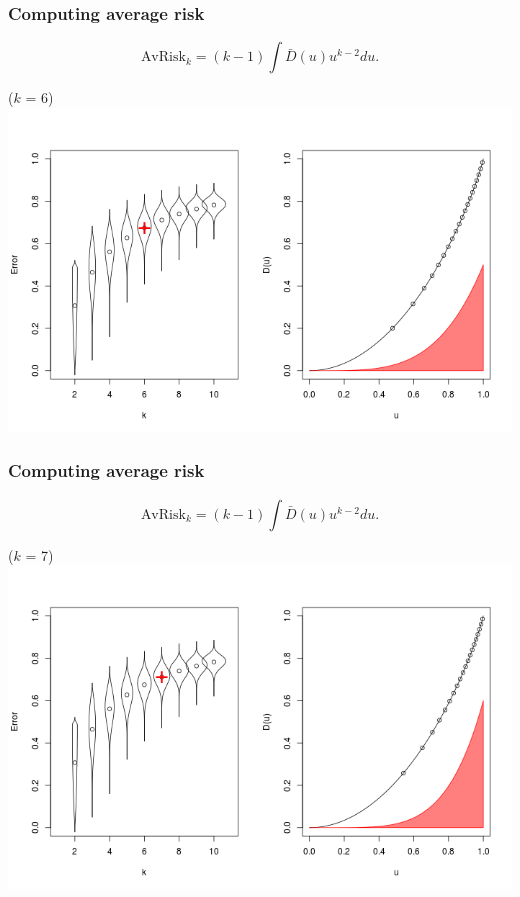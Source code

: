 \documentclass{beamer}
\begin{document}
\begin{frame}
\frametitle{Computing average risk}
\[
\text{AvRisk}_k = (k-1) \int \bar{D}(u) u^{k-2} du.
\]
\begin{center}
($k$ = 6)
\includegraphics[scale = 0.4, clip=true, trim=0 0.1in 0 0.7in]{../extrapolation/rho_0_7_fmla6.png}
\end{center}
\end{frame}

\begin{frame}
\frametitle{Computing average risk}
\[
\text{AvRisk}_k = (k-1) \int \bar{D}(u) u^{k-2} du.
\]
\begin{center}
($k$ = 7)
\includegraphics[scale = 0.4, clip=true, trim=0 0.1in 0 0.7in]{../extrapolation/rho_0_7_fmla7.png}
\end{center}
\end{frame}
\end{document}
